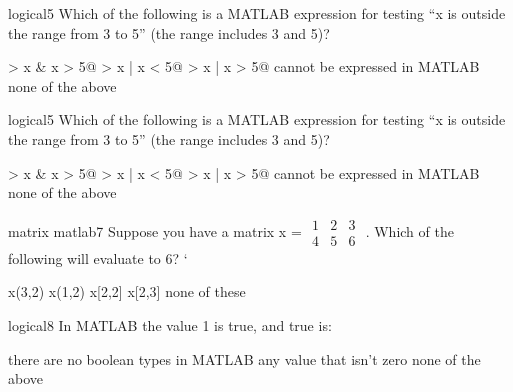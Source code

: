 \documentclass{exam}
\begin{document}
\begin{problem}[requires=logical]{logical}{5} 
  Which of the following is a MATLAB expression for testing ``x is
  outside the range from 3 to 5'' (the range includes 3 and 5)? 
  \begin{answers}  
    \answer {} > x & x > 5@
    \answer {} > x | x < 5@
    \answer[correct]  > x | x > 5@ %
    \answer[fixed] cannot be expressed in MATLAB %
    \answer[fixed] none of the above %
  \end{answers}
\end{problem}

\begin{problem}[requires=logical]{logical}{5} 
  Which of the following is a MATLAB expression for testing ``x is
  outside the range from 3 to 5'' (the range includes 3 and 5)? 
  \begin{answers}  
    \answer {} > x & x > 5@
    \answer {} > x | x < 5@
    \answer[correct]  > x | x > 5@ %
    \answer[fixed] cannot be expressed in MATLAB %
    \answer[fixed] none of the above %
  \end{answers}
\end{problem}

\begin{problem}[requires=matrix matlab]{matrix matlab}{7}
  Suppose you have a matrix x = \footnotesize
  $\begin{array}{ccc}1 & 2 & 3 \\4 & 5 & 6 \end{array}$
  \normalsize. Which of the following will evaluate to 6?
`  \begin{answers}   
    \answer x(3,2)
    \answer x(1,2)
    \answer x[2,2]
    \answer x[2,3] 
     none of these %
  \end{answers}
\end{problem}

\begin{problem}[require=logical]{logical}{8} 
  In MATLAB the value 1 is true, and true is:
  \begin{answers} 
    \answer there are no boolean types in MATLAB
    \answer[correct] any value that isn't zero %
    \answer[fixed] none of the above %
  \end{answers}
\end{problem}
\end{document}
